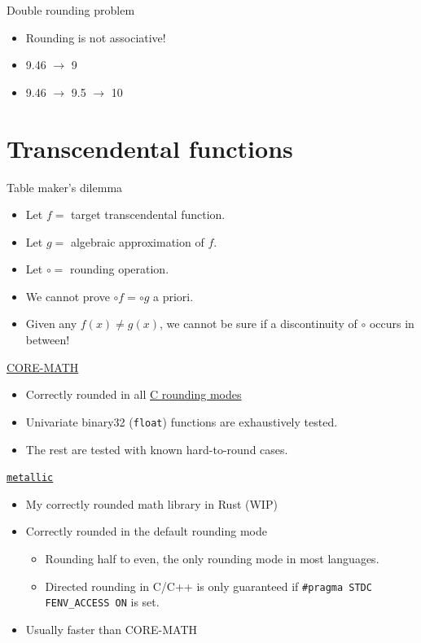 \documentclass{beamer}
\begin{document}
\begin{frame}{Double rounding problem}
	\begin{itemize}
		\item Rounding is not associative!
		\item 9.46 $\to$ 9
		\item 9.46 $\to$ 9.5 $\to$ 10
	\end{itemize}
\end{frame}

\section{Transcendental functions}
\begin{frame}{Table maker's dilemma}
	\begin{itemize}
		\item Let $f =$ target transcendental function.
		\item Let $g =$ algebraic approximation of $f$.
		\item Let $\circ =$ rounding operation.
		\item We cannot prove $\circ f = \circ g$ a priori.
		\item Given any $f \left( x \right) \ne g \left( x \right)$, we cannot
		      be sure if a discontinuity of $\circ$ occurs in between!
	\end{itemize}
\end{frame}

\begin{frame}{\href{https://core-math.gitlabpages.inria.fr/}{CORE-MATH}}
	\begin{itemize}
		\item Correctly rounded in all \href{https://en.cppreference.com/w/c/numeric/fenv/FE_round}{C rounding modes}
		\item Univariate binary32 (\texttt{float}) functions are exhaustively tested.
		\item The rest are tested with known hard-to-round cases.
	\end{itemize}
\end{frame}

\begin{frame}{\href{https://github.com/jdh8/metallic-rs}{\texttt{metallic}}}
	\begin{itemize}
		\item My correctly rounded math library in Rust (WIP)
		\item Correctly rounded in the default rounding mode
		      \begin{itemize}
			      \item Rounding half to even, the only rounding mode in most languages.
			      \item Directed rounding in C/C++ is only guaranteed if
			            \texttt{\#pragma STDC FENV\_ACCESS ON} is set.
		      \end{itemize}
		\item Usually faster than CORE-MATH
	\end{itemize}
\end{frame}
\end{document}
